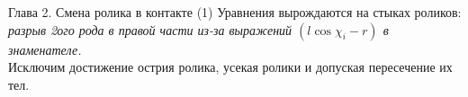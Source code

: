 \begin{frame}{Глава 2. Смена ролика в контакте}
    \textcolor{Periwinkle}{(1) Уравнения вырождаются на стыках роликов:}\\
    \textit{разрыв 2ого рода в правой части из-за выражений $(l\cos\chi_i-r)$ в знаменателе.} \\
    Исключим достижение острия ролика, усекая ролики и допуская пересечение их тел.
    \begin{figure}
        \centering
    \end{figure}
\end{frame}

